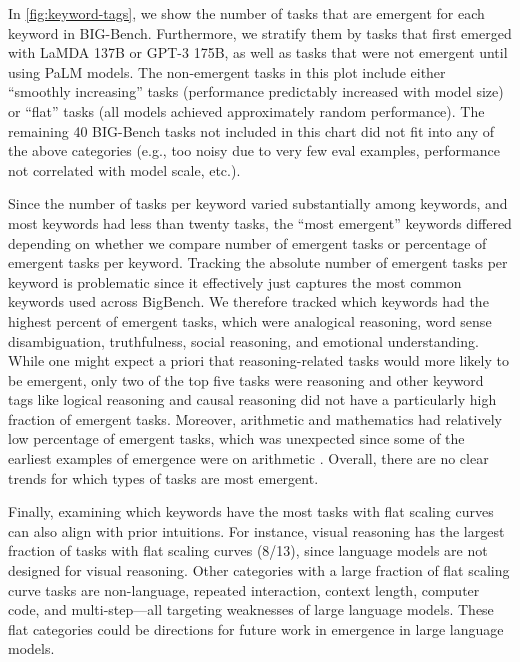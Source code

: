 In \cref{fig:keyword-tags}, we show the number of tasks that are emergent for each keyword in BIG-Bench.
Furthermore, we stratify them by tasks that first emerged with LaMDA 137B or GPT-3 175B, as well as tasks that were not emergent until using PaLM models.
The non-emergent tasks in this plot include either ``smoothly increasing'' tasks (performance predictably increased with model size) or ``flat'' tasks (all models achieved approximately random performance).
The remaining 40 BIG-Bench tasks not included in this chart did not fit into any of the above categories (e.g., too noisy due to very few eval examples, performance not correlated with model scale, etc.).

Since the number of tasks per keyword varied substantially among keywords, and most keywords had less than twenty tasks, the ``most emergent'' keywords differed depending on whether we compare number of emergent tasks or percentage of emergent tasks per keyword.
Tracking the absolute number of emergent tasks per keyword is problematic since it effectively just captures the most common keywords used across BigBench.
We therefore tracked which keywords had the highest percent of emergent tasks, which were analogical reasoning, word sense disambiguation, truthfulness, social reasoning, and emotional understanding.
While one might expect a priori that reasoning-related tasks would more likely to be emergent, only two of the top five tasks were reasoning and other keyword tags like logical reasoning and causal reasoning did not have a particularly high fraction of emergent tasks. 
Moreover, arithmetic and mathematics had relatively low percentage of emergent tasks, which was unexpected since some of the earliest examples of emergence were on arithmetic \citep{brown2020language}.
Overall, there are no clear trends for which types of tasks are most emergent.

Finally, examining which keywords have the most tasks with flat scaling curves can also align with prior intuitions. 
For instance, visual reasoning has the largest fraction of tasks with flat scaling curves (8/13), since language models are not designed for visual reasoning.
Other categories with a large fraction of flat scaling curve tasks are non-language, repeated interaction, context length, computer code, and multi-step---all targeting weaknesses of large language models.
These flat categories could be directions for future work in emergence in large language models.



